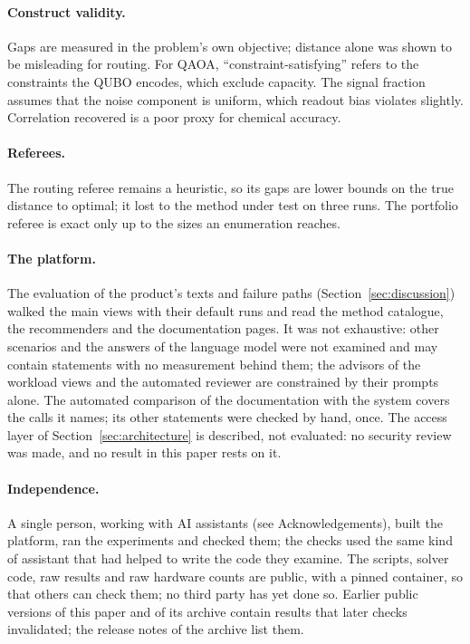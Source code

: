 \documentclass[11pt,a4paper]{article}
\begin{document}
\paragraph{Construct validity.} Gaps are measured in the problem's own
objective; distance alone was shown to be misleading for routing. For QAOA,
``constraint-satisfying'' refers to the constraints the QUBO encodes, which
exclude capacity. The signal fraction assumes that the noise component is
uniform, which readout bias violates slightly. Correlation recovered is a
poor proxy for chemical accuracy.

\paragraph{Referees.} The routing referee remains a heuristic, so its gaps
are lower bounds on the true distance to optimal; it lost to the method
under test on three runs. The portfolio referee is exact only up to the
sizes an enumeration reaches.

\paragraph{The platform.} The evaluation of the product's texts and failure
paths (Section~\ref{sec:discussion}) walked the main views with their
default runs and read the method catalogue, the recommenders and the
documentation pages. It was not exhaustive: other scenarios and the answers
of the language model were not examined and may contain statements with no
measurement behind them;
the advisors of the workload views and the automated reviewer are
constrained by their prompts alone. The automated comparison of the
documentation with the system covers the calls it names; its other
statements were checked by hand, once. The access
layer of Section~\ref{sec:architecture} is described, not evaluated:
no security review was made, and no result in this paper rests
on it.

\paragraph{Independence.} A single person, working with AI assistants
(see Acknowledgements), built the platform, ran the experiments and checked
them; the checks used the same kind of assistant that had helped to write
the code they examine. The scripts, solver code, raw results and raw
hardware counts are public, with a pinned container, so that others can check
them; no third party has yet done so. Earlier public versions of this paper
and of its archive contain results that later checks invalidated; the
release notes of the archive list them.
\end{document}
